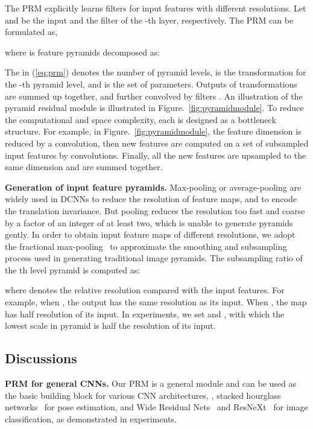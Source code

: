 \documentclass[10pt,twocolumn,letterpaper]{article}
\newcommand{\smalltitle}[1]{\vspace{0.2em}\noindent \textbf{{#1}}}
\begin{document}
The PRM explicitly learns filters for input features with different resolutions. 
Let  and  be the input and the filter of the -th layer, respectively. 
The PRM can be formulated as,
{\small

}
\!\!where  is feature pyramids decomposed as:
{\small 

}
\!\!The  in (\ref{eq:prm}) denotes the number of pyramid levels,  is the transformation for the -th pyramid level, and  is the set of parameters. 
Outputs of transformations  are summed up together, and further convolved by filters . 
An illustration of the pyramid residual module is illustrated in Figure.~\ref{fig:pyramidmodule}. 
To reduce the computational and space complexity, each  is designed as a bottleneck structure. 
For example, in Figure.~\ref{fig:pyramidmodule}, the feature dimension is reduced by a  convolution, then new features are computed on a set of subsampled input features by  convolutions.
Finally, all the new features are upsampled to the same dimension and are summed together.  


\smalltitle{Generation of input feature pyramids. }
Max-pooling or average-pooling are widely used in DCNNs to reduce the resolution of feature maps, and to encode the translation invariance. 
But pooling reduces the resolution too fast and coarse by a factor of an integer of at least two, which is unable to generate pyramids gently.   
In order to obtain input feature maps of different resolutions, we adopt the fractional max-pooling~\cite{graham2014fractional} to approximate the smoothing and subsampling process used in generating traditional image pyramids. 
The subsampling ratio of the th level pyramid is computed as:

where  denotes the relative resolution compared with the input features. 
For example, when , the output  has the same resolution as its input. 
When , the map has half resolution of its input. 
In experiments, we set  and , with which the lowest scale in pyramid is half the resolution of its input.


\subsection{Discussions} 

\smalltitle{PRM for general CNNs. } Our PRM is a general  module and can be used as the basic building block for various CNN architectures, \eg, stacked hourglass networks~\cite{newell2016stacked} for pose estimation, and Wide Residual Nets~\cite{zagoruyko2016WRN} and ResNeXt~\cite{xie2016aggregated} for image classification, as demonstrated in experiments.
\end{document}
